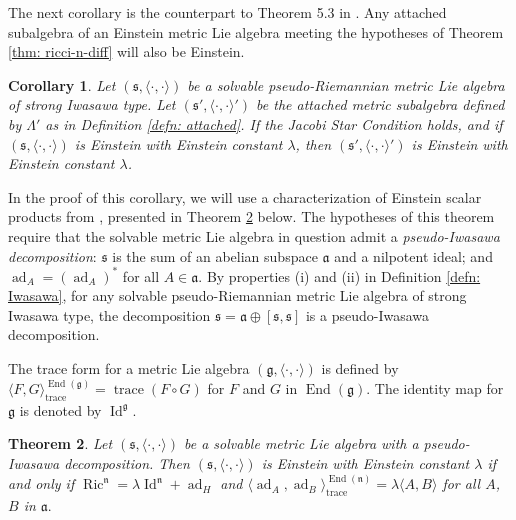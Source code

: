 \documentclass[12pt]{amsart}
\newcommand{\la}{\langle}
\newcommand{\ra}{\rangle}
\newcommand{\trace}{\operatorname{trace}}
\newcommand{\Id}{\operatorname{Id}}
\newcommand{\fraka}{\ensuremath{\mathfrak{a}} }
\newcommand{\frakg}{\ensuremath{\mathfrak{g}} }
\newcommand{\frakn}{\ensuremath{\mathfrak{n}} }
\newcommand{\fraks}{\ensuremath{\mathfrak{s}} }
\renewcommand\a{{\mathfrak{a}}}
\newcommand\ip{{\langle\cdot {,} \cdot\rangle}}
\newcommand\ad{\operatorname{ad}}
\newcommand\End{\operatorname{End}}
\newcommand{\Ric}{\operatorname{Ric}}
\theoremstyle{plain}
\newtheorem{theorem}{Theorem}
\newtheorem{coro}[theorem]{Corollary}
\theoremstyle{definition}
\theoremstyle{remark}
\numberwithin{equation}{section}
\numberwithin{theorem}{section}
\begin{document}
The next corollary is the counterpart 
to Theorem 5.3 in \cite{tamaru-11}. Any attached subalgebra of an Einstein metric Lie algebra meeting the hypotheses of Theorem \ref{thm: ricci-n-diff}  will also be Einstein.

\begin{coro}\label{cor: Einstein}
   Let $(\fraks,\ip)$ be a solvable pseudo-Riemannian
   metric  Lie algebra of strong Iwasawa type. 
    Let $(\fraks', \ip')$ be the attached metric subalgebra defined by $\Lambda'$ 
   as in Definition \ref{defn: attached}. 
 If the Jacobi Star Condition holds, and 
   if $(\fraks,\ip)$ is Einstein with Einstein constant $\lambda$,  then $(\fraks',\ip')$ is Einstein with Einstein constant $\lambda$. 
\end{coro}


In the proof of this corollary, we will use a characterization of Einstein scalar products from \cite{conti-rossi-22}, presented in Theorem \ref{thm: 3.9 conti-rossi} below.   The hypotheses of this theorem require that the solvable 
  metric Lie algebra in question admit 
  a {\em pseudo-Iwasawa decomposition}:  $\fraks$ is the sum of an abelian subspace $\fraka$ and a nilpotent ideal; and  $\ad_A = (\ad_A)^*$ for all $A \in \a$. 
By properties (i) and (ii) in Definition \ref{defn: Iwasawa}, for any  solvable pseudo-Riemannian  metric Lie algebra of strong Iwasawa type, the decomposition $\fraks = \fraka \oplus [\fraks, \fraks]$ is a pseudo-Iwasawa decomposition. 


The trace form for a metric Lie algebra $(\frakg,\ip)$  is defined by $\la F,G\ra_{\trace}^{\End(\frakg)} = \trace (F \circ G)$
  for $F$ and $G$ in $\End(\frakg)$. The identity map for $\frakg$ is denoted by $\Id^{\frakg}$.

\begin{theorem}\cite[Theorem 3.9]{conti-rossi-22}\label{thm: 3.9 conti-rossi}
Let  $(\fraks,\ip)$ be a solvable metric Lie algebra with a pseudo-Iwasawa decomposition. 
Then 
  $(\fraks,\ip)$ is Einstein with Einstein constant $\lambda$ if and only if $\Ric^{\frakn} = \lambda \Id^{\frakn} + \ad_H$  and
  $\la \ad_A, \ad_B \ra_{\trace}^{\End(\frakn)} = \lambda \la A, B \ra$ for all $A$, $B$ in $\fraka.$
\end{theorem}
\end{document}

